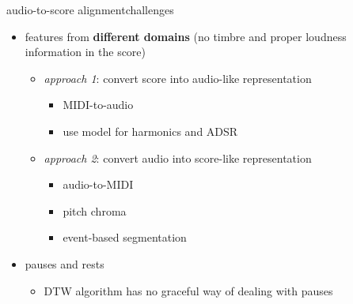         \begin{frame}{audio-to-score alignment}{challenges}
            \begin{itemize}
                \item   features from \textbf{different domains} (no timbre and proper loudness information in the score)
                    \begin{itemize}
                        \item   \textit{approach 1}: convert score into audio-like representation
                            \begin{itemize}
                                \item   MIDI-to-audio
                                \item   use model for harmonics and ADSR
                            \end{itemize}
                        \item   \textit{approach 2}: convert audio into score-like representation
                            \begin{itemize}
                                \item   audio-to-MIDI 
                                \item   pitch chroma
                                \item   event-based segmentation
                            \end{itemize}
                    \end{itemize}
                \bigskip
                \item<2->   pauses and rests
                    \begin{itemize}
                        \item   DTW algorithm has no graceful way of dealing with pauses
                    \end{itemize}
            \end{itemize}
        \end{frame}

    
